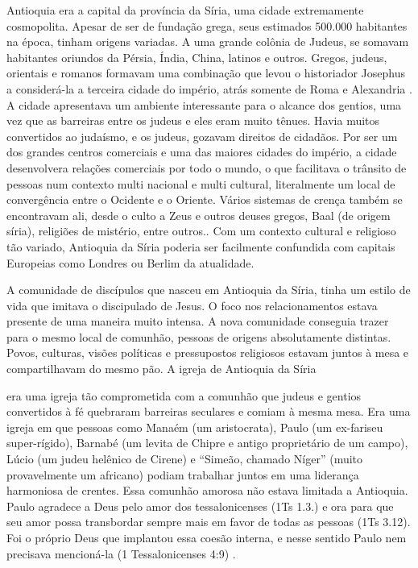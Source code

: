 \documentclass[12pt,openright,oneside,a4paper]{abntex2}
\begin{document}
Antioquia era a capital da província da Síria, uma cidade extremamente cosmopolita. Apesar de ser de fundação grega, seus estimados 500.000 habitantes na época, tinham origens variadas. A uma grande colônia de Judeus, se somavam habitantes oriundos da Pérsia, Índia, China, latinos e outros. Gregos, judeus, orientais e romanos formavam uma combinação que levou o historiador Josephus a considerá-la a terceira cidade do império, atrás somente de Roma e Alexandria \cite[p. 185]{stott}. A cidade apresentava um ambiente interessante para o alcance dos gentios, uma vez que as barreiras entre os judeus e eles eram muito tênues. Havia muitos convertidos ao judaísmo, e os judeus, gozavam direitos de cidadãos. Por ser um dos grandes centros comerciais e uma das maiores cidades do império, a cidade desenvolvera relações comerciais por todo o mundo, o que facilitava o trânsito de pessoas num contexto multi nacional e multi cultural, literalmente um local de convergência entre o Ocidente e o Oriente. Vários sistemas de crença também se encontravam ali, desde o culto a Zeus e outros deuses gregos, Baal (de origem síria), religiões de mistério, entre outros.\cite[p. 166,167]{green}. Com um contexto cultural e religioso tão variado, Antioquia da Síria poderia ser facilmente confundida com capitais Europeias como Londres ou Berlim da atualidade.


A comunidade de discípulos que nasceu em Antioquia da Síria, tinha um estilo de vida que imitava o discipulado de Jesus. O foco nos relacionamentos estava presente de uma maneira muito intensa. A nova comunidade conseguia trazer para o mesmo local de comunhão, pessoas de origens absolutamente distintas. Povos, culturas, visões políticas e pressupostos religiosos estavam juntos à mesa e compartilhavam do mesmo pão. A igreja de Antioquia da Síria

\begin{citacao}
era uma igreja tão comprometida com a comunhão que judeus e gentios convertidos à fé quebraram barreiras seculares e comiam à mesma mesa. Era uma igreja em que pessoas como Manaém (um aristocrata), Paulo (um ex-fariseu super-rígido), Barnabé (um levita de Chipre e antigo proprietário de um campo), Lúcio (um judeu helênico de Cirene) e “Simeão, chamado Níger” (muito provavelmente um africano) podiam trabalhar juntos em uma liderança harmoniosa de crentes. Essa comunhão amorosa não estava limitada a Antioquia. Paulo agradece a Deus pelo amor dos tessalonicenses (1Ts 1.3.) e ora para que seu amor possa transbordar sempre mais em favor de todas as pessoas (1Ts 3.12). Foi o próprio Deus que implantou essa coesão interna, e nesse sentido Paulo nem precisava mencioná-la (1 Tessalonicenses 4:9) \cite[p. 261]{green}.
\end{citacao}
\end{document}
